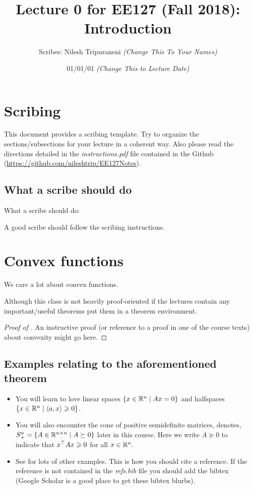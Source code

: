 \documentclass[12pt]{article}
\title{Lecture 0 for EE127 (Fall 2018): Introduction}
\author{Scribes: Nilesh Tripuraneni \textit{(Change This To Your Names)}}
\date{01/01/01 \textit{(Change This to Lecture Date)}}
\begin{document}
\maketitle

\section{Scribing}

This document provides a scribing template. Try to organize the sections/subsections for your lecture in a coherent way. Also please read the directions detailed in the \emph{instructions.pdf} file contained in the Github (\url{https://github.com/nileshtrip/EE127Notes}).

\subsection{What a scribe should do}
What a scribe should do:
\begin{definition}
A good scribe should follow the scribing instructions.
\end{definition}

\section{Convex functions}
We care a lot about convex functions.

\begin{theorem}
Although this class is not heavily proof-oriented if the lectures contain any important/useful theorems put them in a theorem environment.
\end{theorem}
\begin{proof}[Proof of ]
An instructive proof (or reference to a proof in one of the course texts) about convexity might go here.
\end{proof}

\subsection{Examples relating to the aforementioned theorem}
\begin{itemize}
\item You will learn to love linear spaces $\{x\in\mathbb{R}^n\mid Ax=0\}$ and halfspaces $\{x\in\mathbb{R}^n \mid \langle a, x\rangle \geqslant 0 \}$.
\item You will also encounter the cone of positive semidefinite matrices, denotes, $S^n_+ = \{ A\in\mathbb{R}^{n\times n}\mid A\succeq 0\}$ later in this course. Here we write $A\succeq 0$ to indicate that $x^\top A x\geqslant 0$ for all $x\in\mathbb{R}^n.$
\item See \cite[Ch.2]{boyd2004convex} for lots of other examples. This is how you should cite a reference. If the reference is not contained in the \emph{refs.bib} file you should add the bibtex (Google Scholar is a good place to get these bibtex blurbs).
\end{itemize}
\end{document}
